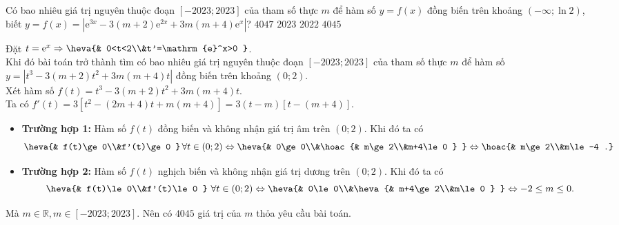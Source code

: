 \begin{ex}%
Có bao nhiêu giá trị nguyên thuộc đoạn $[-2023;2023]$ của tham số thực $m$ để hàm số $y=f(x)$ đồng biến trên khoảng $(-\infty ;\ln 2)$, biết $y=f(x)=\left |\mathrm{e}^{3x}-3(m+2)\mathrm{e}^{2x}+3m(m+4)\mathrm{e}^x \right |$?
\choice 
{$4047$} 
{$2023$}
{$2022$} 
{\True $4045$}
\loigiai
{
Đặt $t=\mathrm{e}^x\Rightarrow\heva{& 0<t<2\\&t'=\mathrm{e}^x>0 }$.\\
Khi đó bài toán trở thành tìm có bao nhiêu giá trị nguyên thuộc đoạn $[-2023;2023]$ của tham số thực $m$ để hàm số $y=\left |t^3-3(m+2)t^2+3m(m+4)t \right |$ đồng biến trên khoảng $(0;2)$.\\
Xét hàm số $f(t)=t^3-3(m+2)t^2+3m(m+4)t$.\\
Ta có $f'(t)=3\left [t^2-(2m+4)t+m(m+4) \right ]=3(t-m)[t-(m+4)]$.
\begin{itemize}
\item\textbf{Trường hợp 1:} Hàm số $f(t)$ đồng biến và không nhận giá trị âm trên $(0;2)$. Khi đó ta có $$\heva{& f(t)\ge 0\\&f'(t)\ge 0 }\,\forall t\in (0;2)\Leftrightarrow\heva{& 0\ge 0\\&\hoac{& m\ge 2\\&m+4\le 0 } }\Leftrightarrow\hoac{& m\ge 2\\&m\le -4 .}$$
\item\textbf{Trường hợp 2:} Hàm số $f(t)$ nghịch biến và không nhận giá trị dương trên $(0;2)$. Khi đó ta có 
$$\heva{& f(t)\le 0\\&f'(t)\le 0 }\,\,\forall t\in (0;2)\Leftrightarrow\heva{& 0\le 0\\&\heva{& m+4\ge 2\\&m\le 0 } }\Leftrightarrow -2\le m\le 0.$$
\end{itemize}
Mà $m\in\mathbb{R},m\in [-2023;2023]$. Nên có $4045$ giá trị của $m$ thỏa yêu cầu bài toán.
}
\end{ex}

